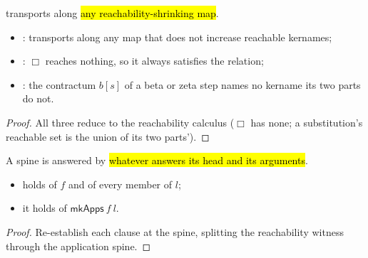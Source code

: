 \begin{lemma}
\label{lem:ErasesEnv-ofReach}
\leanok
{}
 \ErasesEnv{} transports along \hl{any reachability-shrinking map}.
\begin{itemize}
\item {}: transports along any map that does not increase reachable kernames;
\item {}: $\Box$ reaches nothing, so it always satisfies the relation;
\item {}: the contractum $b[s]$ of a beta or zeta step names no kername its two
parts do not.
\end{itemize}
\end{lemma}
\begin{proof}
\leanok
{}
 All three reduce to the reachability calculus ($\Box$ has none; a substitution's reachable
set is the union of its two parts').
\end{proof}

\begin{lemma}
\label{lem:ErasesEnv-mkApps}
\leanok
{}
 A spine is answered by \hl{whatever answers its head and its arguments}.
\begin{itemize}
\item {} \ErasesEnv{} holds of $f$ and of every member of $l$;
\item {} it holds of $\mathsf{mkApps}\ f\ l$.
\end{itemize}
\end{lemma}
\begin{proof}
\leanok
{}
 Re-establish each clause at the spine, splitting the reachability witness through the
application spine.
\end{proof}

